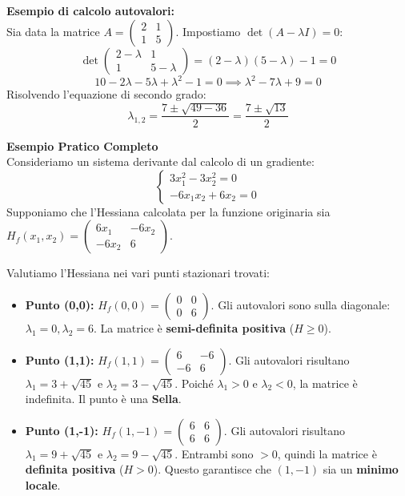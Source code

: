 \documentclass[12pt, a4paper]{article}
\newcommand{\separatore}{\noindent{\color{titlecolor!50}\rule{\textwidth}{0.6pt}}}
\begin{document}
	\textbf{Esempio di calcolo autovalori:}\\
	Sia data la matrice $A = \begin{pmatrix} 2 & 1 \\ 1 & 5 \end{pmatrix}$. 
	Impostiamo $\det(A - \lambda I) = 0$:
	\[
	\det \begin{pmatrix} 2 - \lambda & 1 \\ 1 & 5 - \lambda \end{pmatrix} = (2 - \lambda)(5 - \lambda) - 1 = 0
	\]
	\[ 10 - 2\lambda - 5\lambda + \lambda^2 - 1 = 0 \implies \lambda^2 - 7\lambda + 9 = 0 \]
	Risolvendo l'equazione di secondo grado:
	\[ \lambda_{1,2} = \frac{7 \pm \sqrt{49 - 36}}{2} = \frac{7 \pm \sqrt{13}}{2} \]
	
	\vspace{0.4cm}
	\separatore
	\vspace{0.4cm}
	
	\textbf{Esempio Pratico Completo}\\
	Consideriamo un sistema derivante dal calcolo di un gradiente:
	\[
	\begin{cases}
		3x_1^2 - 3x_2^2 = 0 \\
		-6x_1 x_2 + 6x_2 = 0
	\end{cases}
	\]
	Supponiamo che l'Hessiana calcolata per la funzione originaria sia $H_f(x_1, x_2) = \begin{pmatrix} 6x_1 & -6x_2 \\ -6x_2 & 6 \end{pmatrix}$.
	
	Valutiamo l'Hessiana nei vari punti stazionari trovati:
	\begin{itemize}
		\item \textbf{Punto (0,0):} $H_f(0,0) = \begin{pmatrix} 0 & 0 \\ 0 & 6 \end{pmatrix}$. 
		Gli autovalori sono sulla diagonale: $\lambda_1 = 0, \lambda_2 = 6$. La matrice è \textbf{semi-definita positiva} ($H \ge 0$).
		
		\item \textbf{Punto (1,1):} $H_f(1,1) = \begin{pmatrix} 6 & -6 \\ -6 & 6 \end{pmatrix}$.
		Gli autovalori risultano $\lambda_1 = 3 + \sqrt{45}$ e $\lambda_2 = 3 - \sqrt{45}$. Poiché $\lambda_1 > 0$ e $\lambda_2 < 0$, la matrice è indefinita. Il punto è una \textbf{Sella}.
		
		\item \textbf{Punto (1,-1):} $H_f(1,-1) = \begin{pmatrix} 6 & 6 \\ 6 & 6 \end{pmatrix}$.
		Gli autovalori risultano $\lambda_1 = 9 + \sqrt{45}$ e $\lambda_2 = 9 - \sqrt{45}$. Entrambi sono $> 0$, quindi la matrice è \textbf{definita positiva} ($H > 0$). Questo garantisce che $(1,-1)$ sia un \textbf{minimo locale}.
	\end{itemize}
	
\end{document}
